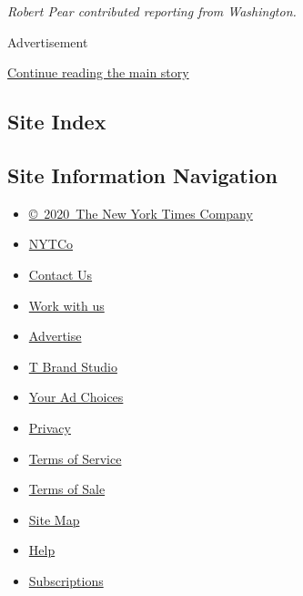 \emph{Robert Pear contributed reporting from Washington.}

Advertisement

\protect\hyperlink{after-bottom}{Continue reading the main story}

\hypertarget{site-index}{%
\subsection{Site Index}\label{site-index}}

\hypertarget{site-information-navigation}{%
\subsection{Site Information
Navigation}\label{site-information-navigation}}

\begin{itemize}
\tightlist
\item
  \href{https://help.nytimes3xbfgragh.onion/hc/en-us/articles/115014792127-Copyright-notice}{©~2020~The
  New York Times Company}
\end{itemize}

\begin{itemize}
\tightlist
\item
  \href{https://www.nytco.com/}{NYTCo}
\item
  \href{https://help.nytimes3xbfgragh.onion/hc/en-us/articles/115015385887-Contact-Us}{Contact
  Us}
\item
  \href{https://www.nytco.com/careers/}{Work with us}
\item
  \href{https://nytmediakit.com/}{Advertise}
\item
  \href{http://www.tbrandstudio.com/}{T Brand Studio}
\item
  \href{https://www.nytimes3xbfgragh.onion/privacy/cookie-policy\#how-do-i-manage-trackers}{Your
  Ad Choices}
\item
  \href{https://www.nytimes3xbfgragh.onion/privacy}{Privacy}
\item
  \href{https://help.nytimes3xbfgragh.onion/hc/en-us/articles/115014893428-Terms-of-service}{Terms
  of Service}
\item
  \href{https://help.nytimes3xbfgragh.onion/hc/en-us/articles/115014893968-Terms-of-sale}{Terms
  of Sale}
\item
  \href{https://spiderbites.nytimes3xbfgragh.onion}{Site Map}
\item
  \href{https://help.nytimes3xbfgragh.onion/hc/en-us}{Help}
\item
  \href{https://www.nytimes3xbfgragh.onion/subscription?campaignId=37WXW}{Subscriptions}
\end{itemize}
